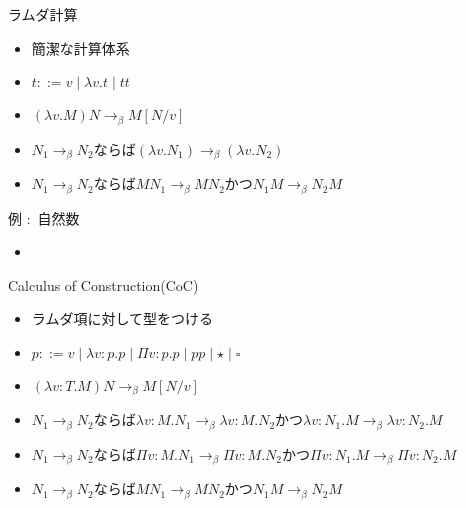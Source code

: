 \documentclass[18pt]{beamer}
\begin{document}
\begin{frame}{ラムダ計算}
 \begin{itemize}
  \item 簡潔な計算体系
  \item $t ::= v \mid \lambda v. t \mid t t$
  \item $(\lambda v. M) N \rightarrow_\beta M[N/v]$
  \item $N_1 \rightarrow_\beta N_2$ならば$(\lambda v. N_1) \rightarrow_\beta (\lambda v. N_2)$ 
  \item $N_1 \rightarrow_\beta N_2$ならば$M N_1 \rightarrow_\beta M N_2$かつ$N_1 M \rightarrow_\beta N_2 M$
 \end{itemize}
\end{frame}

\begin{frame}{例 $\colon$ 自然数}
 \begin{itemize}
  \item 
 \end{itemize}
\end{frame}

\begin{frame}{Calculus of Construction(CoC)}
 \begin{itemize}
  \item ラムダ項に対して型をつける
  \item $p ::= v \mid \lambda v \colon p. p \mid \Pi v \colon p. p \mid p p \mid \star \mid \square$
  \item $(\lambda v \colon T. M) N \rightarrow_\beta M[N/v]$
  \item $N_1 \rightarrow_\beta N_2$ならば$\lambda v \colon M. N_1 \rightarrow_\beta \lambda v \colon M. N_2$かつ$\lambda v \colon N_1. M \rightarrow_\beta \lambda v \colon N_2. M$
  \item $N_1 \rightarrow_\beta N_2$ならば$\Pi v \colon M. N_1 \rightarrow_\beta \Pi v \colon M. N_2$かつ$\Pi v \colon N_1. M \rightarrow_\beta \Pi v \colon N_2. M$
  \item $N_1 \rightarrow_\beta N_2$ならば$M N_1 \rightarrow_\beta M N_2$かつ$N_1 M \rightarrow_\beta N_2 M$
 \end{itemize}
\end{frame}
\end{document}
